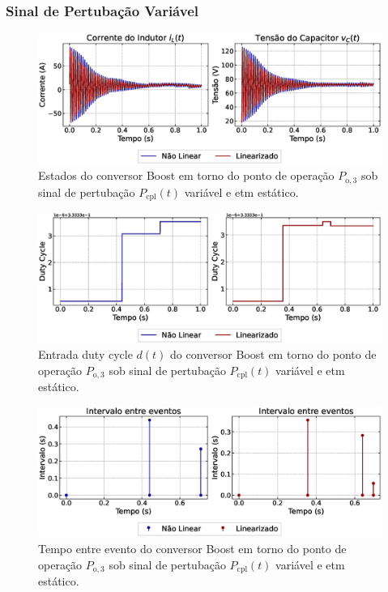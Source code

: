 \subsubsection{Sinal de Pertubação Variável}

\begin{figure}[H]
  \centering
  \captionsetup{justification=centering}
  \includegraphics[width=1.\textwidth]{figuras/static-etm/boost/sim2/op1/result.eps}
  \caption{Estados do conversor Boost em torno do ponto de operação $P_{\mathrm{o}, 3}$ sob sinal de pertubação $P_{\mathrm{cpl}}(t)$ variável e \acrshort{etm} estático.}
\end{figure}

\begin{figure}[H]
  \centering
  \captionsetup{justification=centering}
  \includegraphics[width=1.\textwidth]{figuras/static-etm/boost/sim2/op1/duty-cycle.eps}
  \caption{Entrada duty cycle $d(t)$ do conversor Boost em torno do ponto de operação $P_{\mathrm{o}, 3}$ sob sinal de pertubação $P_{\mathrm{cpl}}(t)$ variável e \acrshort{etm} estático.}
\end{figure}

\begin{figure}[H]
  \centering
  \captionsetup{justification=centering}
  \includegraphics[width=1.\textwidth]{figuras/static-etm/boost/sim2/op1/inter-event-times.eps}
  \caption{Tempo entre evento do conversor Boost em torno do ponto de operação $P_{\mathrm{o}, 3}$ sob sinal de pertubação $P_{\mathrm{cpl}}(t)$ variável e \acrshort{etm} estático.}
\end{figure}

